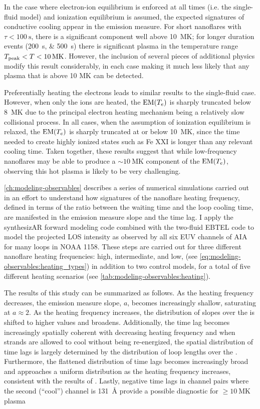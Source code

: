 In the case where electron-ion equilibrium is enforced at all times (i.e. the single-fluid model) and ionization equilibrium is assumed, the expected signatures of conductive cooling appear in the emission measure. For short nanoflares with $\tau<\SI{100}{\second}$, there is a significant component well above \SI{10}{\mega\kelvin}; for longer duration events (\SIlist{200;500}{\second}) there is significant plasma in the temperature range $T_\textup{peak} < T < \SI{10}{\mega\kelvin}$. However, the inclusion of several pieces of additional physics modify this result considerably, in each case making it much less likely that any plasma that is above 10 MK can be detected.

Preferentially heating the electrons leads to similar results to the single-fluid case. However, when only the ions are heated, the $\textup{EM}(T_e)$ is sharply truncated below \SI{8}{\mega\kelvin} due to the principal electron heating mechanism being a relatively slow collisional process. In all cases, when the assumption of ionization equilibrium is relaxed, the $\textup{EM}(T_e)$ is sharply truncated at or below \SI{10}{\mega\kelvin}, since the time needed to create highly ionized states such as Fe XXI is longer than any relevant cooling time. Taken together, these results suggest that while low-frequency nanoflares may be able to produce a $\sim\SI{10}{\mega\kelvin}$ component of the $\textup{EM}(T_e)$, observing this hot plasma is likely to be very challenging. 

\autoref{ch:modeling-observables} describes a series of numerical simulations carried out in an effort to understand how signatures of the nanoflare heating frequency, defined in terms of the ratio between the waiting time and the loop cooling time, are manifested in the emission measure slope and the time lag. I apply the synthesizAR forward modeling code combined with the two-fluid EBTEL code to model the projected LOS intensity as observed by all six EUV channels of AIA for many loops in \AR{} NOAA 1158. These steps are carried out for three different nanoflare heating frequencies: high, intermediate, and low, (see \autoref{eq:modeling-observables:heating_types}) in addition to two control models, for a total of five different heating scenarios (see \autoref{tab:modeling-observables:heating}).

The results of this study can be summarized as follows. As the heating frequency decreases, the emission measure slope, $a$, becomes increasingly shallow, saturating at $a\approx2$. As the heating frequency increases, the distribution of slopes over the \AR{} is shifted to higher values and broadens. Additionally, the time lag becomes increasingly spatially coherent with decreasing heating frequency and when strands are allowed to cool without being re-energized, the spatial distribution of time lags is largely determined by the distribution of loop lengths over the \AR{}. Furthermore, the flattened distribution of time lags becomes increasingly broad and approaches a uniform distribution as the heating frequency increases, consistent with the results of \citet{viall_signatures_2016}. Lastly, negative time lags in channel pairs where the second (``cool'') channel is \SI{131}{\angstrom} provide a possible diagnostic for $\ge\SI{10}{\mega\kelvin}$ plasma


